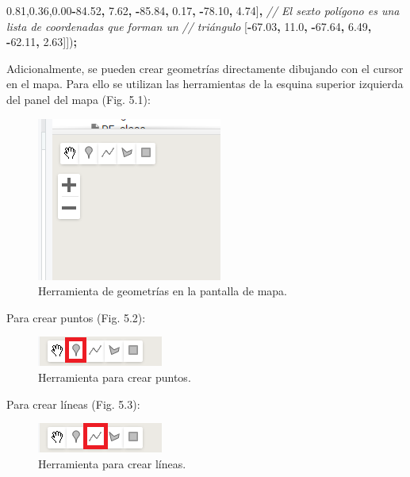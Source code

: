 \documentclass[
  12pt,
  letterpaper,
  twoside]{book}
\newenvironment{Shaded}{\begin{snugshade}}{\end{snugshade}}
\newcommand{\CommentTok}[1]{\textcolor[rgb]{0.56,0.35,0.01}{\textit{#1}}}
\newcommand{\FloatTok}[1]{\textcolor[rgb]{0.00,0.00,0.81}{#1}}
\newcommand{\NormalTok}[1]{#1}
\newcommand{\OperatorTok}[1]{\textcolor[rgb]{0.81,0.36,0.00}{\textbf{#1}}}
\begin{document}
\begin{Shaded}
\begin{Highlighting}[]
\NormalTok{    [}\OperatorTok{{-}}\FloatTok{84.52}\OperatorTok{,} \FloatTok{7.62}\OperatorTok{,}         
     \OperatorTok{{-}}\FloatTok{85.84}\OperatorTok{,} \FloatTok{0.17}\OperatorTok{,}
     \OperatorTok{{-}}\FloatTok{78.10}\OperatorTok{,} \FloatTok{4.74}\NormalTok{]}\OperatorTok{,}
    \CommentTok{// El sexto polígono es una lista de coordenadas que forman un }
    \CommentTok{// triángulo}
\NormalTok{    [}\OperatorTok{{-}}\FloatTok{67.03}\OperatorTok{,} \FloatTok{11.0}\OperatorTok{,}         
     \OperatorTok{{-}}\FloatTok{67.64}\OperatorTok{,} \FloatTok{6.49}\OperatorTok{,}
     \OperatorTok{{-}}\FloatTok{62.11}\OperatorTok{,} \FloatTok{2.63}\NormalTok{]])}\OperatorTok{;}
\end{Highlighting}
\end{Shaded}

Adicionalmente, se pueden crear geometrías directamente dibujando con el cursor en el mapa. Para ello se utilizan las herramientas de la esquina superior izquierda del panel del mapa (Fig. 5.1):

\begin{figure}[btp]

{\centering \includegraphics[width=0.3\linewidth]{Img/geometrias} 

}

\caption{Herramienta de geometrías en la pantalla de mapa.}\label{fig:unnamed-chunk-56}
\end{figure}

Para crear puntos (Fig. 5.2):

\begin{figure}[btp]

{\centering \includegraphics[width=0.2\linewidth]{Img/punto} 

}

\caption{Herramienta para crear puntos.}\label{fig:unnamed-chunk-57}
\end{figure}

Para crear líneas (Fig. 5.3):

\begin{figure}[btp]

{\centering \includegraphics[width=0.2\linewidth]{Img/linea} 

}

\caption{Herramienta para crear líneas.}\label{fig:unnamed-chunk-58}
\end{figure}
\end{document}
